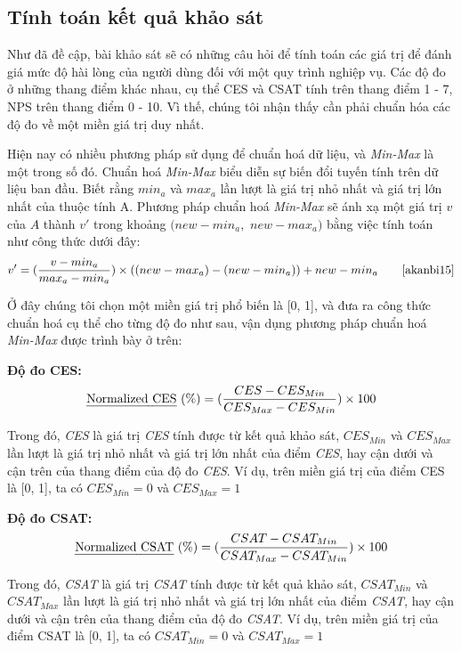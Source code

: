 \subsection{Tính toán kết quả khảo sát}
Như đã đề cập, bài khảo sát sẽ có những câu hỏi để tính toán các giá trị để đánh giá mức độ hài lòng của người dùng đối với một quy trình nghiệp vụ. Các độ đo ở những thang điểm khác nhau, cụ thể CES và CSAT tính trên thang điểm 1 - 7, NPS trên thang điểm 0 - 10. Vì thế, chúng tôi nhận thấy cần phải chuẩn hóa các độ đo về một miền giá trị duy nhất. 
\par
Hiện nay có nhiều phương pháp sử dụng để chuẩn hoá dữ liệu, và \emph{Min-Max} là một trong số đó. Chuẩn hoá \emph{Min-Max} biểu diễn sự biến đổi tuyến tính trên dữ liệu ban đầu. Biết rằng $min_a$ và $max_a$ lần lượt là giá trị nhỏ nhất và giá trị lớn nhất của thuộc tính A. Phương pháp chuẩn hoá \emph{Min-Max} sẽ ánh xạ một giá trị $v$ của $A$ thành $v'$ trong khoảng $(new-min_a,$ $new-max_a)$ bằng việc tính toán như công thức dưới đây:
\[ v' = (\frac{v - min_a}{max_a - min_a}) \times ((new-max_a) - (new-min_a)) + new-min_a \tag*{\cite{akanbi15}}\]

Ở đây chúng tôi chọn một miền giá trị phổ biến là [0, 1], và đưa ra công thức chuẩn hoá cụ thể cho từng độ đo như sau, vận dụng phương pháp chuẩn hoá \emph{Min-Max} được trình bày ở trên:

\textbf{Độ đo CES:}
\[ \text{\emph{Normalized CES} (\%)} = (\frac{CES - CES_{Min}}{CES_{Max} - CES_{Min}}) \times 100\]
\par
Trong đó, \emph{CES} là giá trị \emph{CES} tính được từ kết quả khảo sát, $CES_{Min}$ và $CES_{Max}$ lần lượt là giá trị nhỏ nhất và giá trị lớn nhất của điểm \emph{CES}, hay cận dưới và cận trên của thang điểm của độ đo \emph{CES}. Ví dụ, trên miền giá trị của điểm CES là [0, 1], ta có $CES_{Min} = 0$ và $CES_{Max} = 1$

\textbf{Độ đo CSAT:}
\[ \text{\emph{Normalized CSAT} (\%)} = (\frac{CSAT - CSAT_{Min}}{CSAT_{Max} - CSAT_{Min}}) \times 100\]
\par
Trong đó, \emph{CSAT} là giá trị \emph{CSAT} tính được từ kết quả khảo sát, $CSAT_{Min}$ và $CSAT_{Max}$ lần lượt là giá trị nhỏ nhất và giá trị lớn nhất của điểm \emph{CSAT}, hay cận dưới và cận trên của thang điểm của độ đo \emph{CSAT}. Ví dụ, trên miền giá trị của điểm CSAT là [0, 1], ta có $CSAT_{Min} = 0$ và $CSAT_{Max} = 1$

